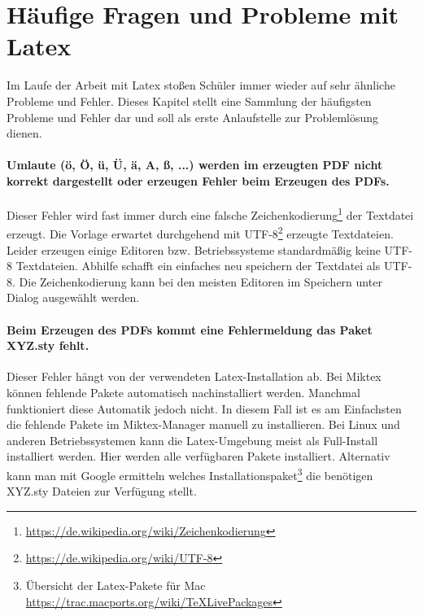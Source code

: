\chapter{Häufige Fragen und Probleme mit Latex}

Im Laufe der Arbeit mit Latex stoßen Schüler immer wieder auf sehr ähnliche Probleme und Fehler. 
Dieses Kapitel stellt eine Sammlung der häufigsten Probleme und Fehler dar und soll als erste Anlaufstelle zur Problemlösung dienen.

\subsubsection*{Umlaute (ö, Ö, ü, Ü, ä, A, ß, ...) werden im erzeugten PDF nicht korrekt dargestellt oder erzeugen Fehler beim Erzeugen des PDFs.}
Dieser Fehler wird fast immer durch eine falsche Zeichenkodierung\footnote{\url{https://de.wikipedia.org/wiki/Zeichenkodierung}} der Textdatei erzeugt. 
Die Vorlage erwartet durchgehend mit UTF-8\footnote{\url{https://de.wikipedia.org/wiki/UTF-8}} erzeugte Textdateien. 
Leider erzeugen einige Editoren bzw. Betriebssysteme standardmäßig keine UTF-8 Textdateien. Abhilfe schafft ein einfaches neu speichern der Textdatei als UTF-8. 
Die Zeichenkodierung kann bei den meisten Editoren im Speichern unter Dialog ausgewählt werden.

\subsubsection*{Beim Erzeugen des PDFs kommt eine Fehlermeldung das Paket XYZ.sty fehlt.}
Dieser Fehler hängt von der verwendeten Latex-Installation ab. Bei Miktex können fehlende Pakete automatisch nachinstalliert werden. 
Manchmal funktioniert diese Automatik jedoch nicht. In diesem Fall ist es am Einfachsten die fehlende Pakete im Miktex-Manager manuell zu installieren. 
Bei Linux und anderen Betriebssystemen kann die Latex-Umgebung meist als Full-Install installiert werden. Hier werden alle verfügbaren Pakete installiert. 
Alternativ kann man mit Google ermitteln welches Installationspaket\footnote{Übersicht der Latex-Pakete für Mac \url{https://trac.macports.org/wiki/TeXLivePackages}} die benötigen XYZ.sty Dateien zur Verfügung stellt.